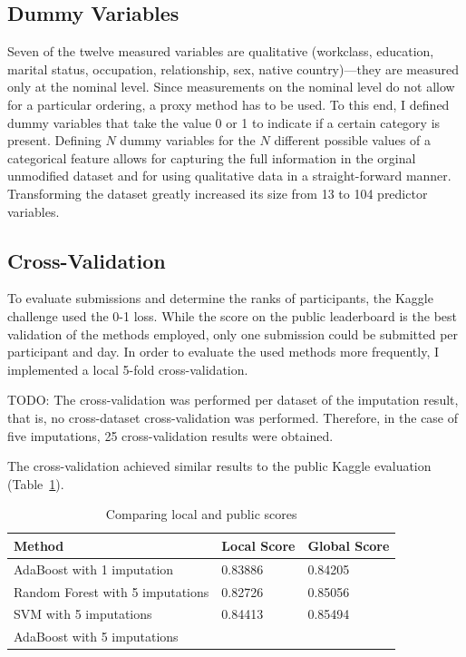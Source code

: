 \documentclass[a4paper]{article}
\begin{document}

\subsection{Dummy Variables}

Seven of the twelve measured variables are qualitative (workclass,
education, marital status, occupation, relationship, sex, native
country)---they are measured only at the nominal level. Since
measurements on the nominal level do not allow for a particular
ordering, a proxy method has to be used. To this end, I defined dummy
variables that take the value 0 or 1 to indicate if a certain category
is present. Defining $N$ dummy variables for the $N$ different
possible values of a categorical feature allows for capturing the full
information in the orginal unmodified dataset and for using
qualitative data in a straight-forward manner.
Transforming the dataset greatly increased its size from 13 to 104 predictor variables.

\subsection{Cross-Validation}
\label{sec:cross}

To evaluate submissions and determine the ranks of participants, the
Kaggle challenge used the 0-1 loss. While the score on the public leaderboard
is the best validation of the methods employed, only one submission
could be submitted per participant and day. In order to evaluate the
used methods more frequently, I implemented a local 5-fold cross-validation. 

TODO: The cross-validation was performed per dataset of the
imputation result, that is, no cross-dataset cross-validation was
performed. Therefore, in the case of five imputations, 25
cross-validation results were obtained.

The cross-validation achieved similar results to the public
Kaggle evaluation (Table~\ref{tab:localpublic}).

\begin{table}[h]
  \centering
  \begin{tabular}{lll}
    \toprule
    Method & Local Score & Global Score\\
    \midrule
    AdaBoost with 1 imputation & 0.83886 & 0.84205\\
    Random Forest with 5 imputations & 0.82726 & 0.85056\\
    SVM with 5 imputations & 0.84413 & 0.85494\\
    AdaBoost with 5 imputations & & \\
    \bottomrule
  \end{tabular}
  \caption{{Comparing local and public scores}}
  \label{tab:localpublic}
\end{table}
\end{document}

